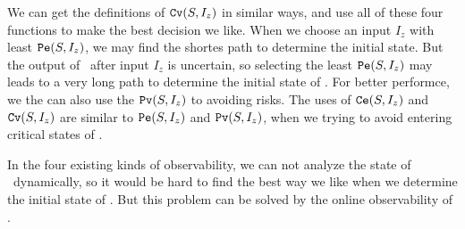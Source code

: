 We can get the definitions of ${\tt Cv}(S, I_z)$ in similar ways, and use all of these four functions to make the best decision we like. When we choose an input $I_z$ with least ${\tt Pe}(S, I_z)$, we may find the shortes path to determine the initial state. But the output of \BCNs\ after input $I_z$ is uncertain, so selecting the least ${\tt Pe}(S, I_z)$ may leads to a very long path to determine the initial state of \BCNs. For better performce, we the can also use the ${\tt Pv}(S, I_z)$ to avoiding risks. The uses of ${\tt Ce}(S, I_z)$ and ${\tt Cv}(S, I_z)$ are similar to ${\tt Pe}(S, I_z)$ and ${\tt Pv}(S, I_z)$, when we trying to avoid entering critical states of \BCNs.

In the four existing kinds of observability, we can not analyze the state of \BCNs\ dynamically, so it would be hard to find the best way we like when we determine the initial state of \BCNs. But this problem can be solved by the online observability of \BCNs.